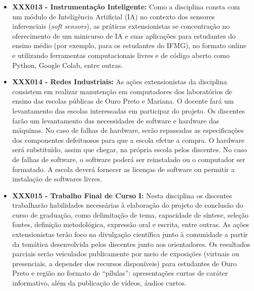 \documentclass[
	12pt,				%
	openright,			%
	oneside,			%
	a4paper,			%
	english,			%
	brazil				%
	]{abntex2}
\begin{document}
\begin{itemize}
    \item \textbf{XXX013 - Instrumentação Inteligente:} Como a disciplina consta com um módulo de Inteligência Artificial (IA) no contexto dos sensores inferenciais (\textit{soft sensors}), as práticas extensionistas se concentração no oferecimento de um minicurso de IA e suas aplicações para estudantes do ensino médio (por exemplo, para os estudantes do IFMG), no formato online e utilizando ferramentas computacionais livres e de código aberto como Python, Google Colab, entre outras.

    \item \textbf{XXX014 - Redes Industriais:} As ações extensionistas da disciplina consistem em realizar manutenção em computadores dos laboratórios de ensino das escolas públicas de Ouro Preto e Mariana. O docente fará um levantamento das escolas interessadas em participar do projeto. Os discentes farão um levantamento das necessidades de software e hardware das máquinas. No caso de falhas de hardware, serão repassadas as especificações dos componentes defeituosos para que a escola efetue a compra. O hardware será substituído, assim que chegar, na própria escola pelos discentes. No caso de falhas de software, o software poderá ser reinstalado ou o computador ser formatado. A escola deverá fornecer as licenças de software ou permitir a instalação de softwares livres.

     \item \textbf{XXX015 - Trabalho Final de Curso I:} Nesta disciplina os discentes trabalharão habilidades necessárias à elaboração do projeto de conclusão do curso de graduação, como delimitação de tema, capacidade de síntese, seleção fontes, definição metodológica, expressão oral e escrita, entre outras. As ações extensionistas terão foco na divulgação científica junto à comunidade a partir da temática desenvolvida pelos discentes junto aos orientadores. Os resultados parciais serão veiculados publicamente por meio de exposições (virtuais ou presenciais, a depender dos recursos disponíveis) para estudantes de Ouro Preto e região no formato de ``pílulas'': apresentações curtas de caráter informativo, além da publicação de vídeos, áudios  curtos.


\end{itemize}
\end{document}
